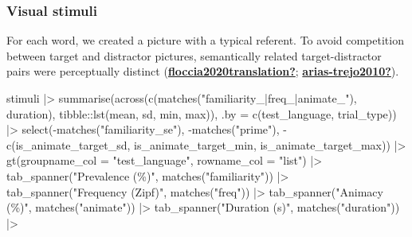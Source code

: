 \documentclass[
  letterpaper,
  DIV=11,
  numbers=noendperiod]{scrartcl}
\newenvironment{Shaded}{\begin{snugshade}}{\end{snugshade}}
\newcommand{\AttributeTok}[1]{\textcolor[rgb]{0.40,0.45,0.13}{#1}}
\newcommand{\FunctionTok}[1]{\textcolor[rgb]{0.28,0.35,0.67}{#1}}
\newcommand{\NormalTok}[1]{\textcolor[rgb]{0.00,0.23,0.31}{#1}}
\newcommand{\SpecialCharTok}[1]{\textcolor[rgb]{0.37,0.37,0.37}{#1}}
\newcommand{\StringTok}[1]{\textcolor[rgb]{0.13,0.47,0.30}{#1}}
\begin{document}
\hypertarget{visual-stimuli}{%
\subsubsection{Visual stimuli}\label{visual-stimuli}}

For each word, we created a picture with a typical referent. To avoid
competition between target and distractor pictures, semantically related
target-distractor pairs were perceptually distinct
(\protect\hyperlink{ref-floccia2020translation}{\textbf{floccia2020translation?}};
\protect\hyperlink{ref-arias-trejo2010}{\textbf{arias-trejo2010?}}).

\begin{Shaded}
\begin{Highlighting}[]
\NormalTok{stimuli }\SpecialCharTok{|\textgreater{}} 
    \FunctionTok{summarise}\NormalTok{(}\FunctionTok{across}\NormalTok{(}\FunctionTok{c}\NormalTok{(}\FunctionTok{matches}\NormalTok{(}\StringTok{"familiarity\_|freq\_|animate\_"}\NormalTok{), duration),}
\NormalTok{                     tibble}\SpecialCharTok{::}\FunctionTok{lst}\NormalTok{(mean, sd, min, max)),}
              \AttributeTok{.by =} \FunctionTok{c}\NormalTok{(test\_language, trial\_type)) }\SpecialCharTok{|\textgreater{}} 
    \FunctionTok{select}\NormalTok{(}\SpecialCharTok{{-}}\FunctionTok{matches}\NormalTok{(}\StringTok{"familiarity\_se"}\NormalTok{), }\SpecialCharTok{{-}}\FunctionTok{matches}\NormalTok{(}\StringTok{"prime"}\NormalTok{),}
           \SpecialCharTok{{-}}\FunctionTok{c}\NormalTok{(is\_animate\_target\_sd,}
\NormalTok{              is\_animate\_target\_min,}
\NormalTok{              is\_animate\_target\_max)) }\SpecialCharTok{|\textgreater{}} 
    \FunctionTok{gt}\NormalTok{(}\AttributeTok{groupname\_col =} \StringTok{"test\_language"}\NormalTok{,}
       \AttributeTok{rowname\_col =} \StringTok{"list"}\NormalTok{) }\SpecialCharTok{|\textgreater{}} 
    \FunctionTok{tab\_spanner}\NormalTok{(}\StringTok{"Prevalence (\%)"}\NormalTok{, }\FunctionTok{matches}\NormalTok{(}\StringTok{"familiarity"}\NormalTok{)) }\SpecialCharTok{|\textgreater{}} 
    \FunctionTok{tab\_spanner}\NormalTok{(}\StringTok{"Frequency (Zipf)"}\NormalTok{, }\FunctionTok{matches}\NormalTok{(}\StringTok{"freq"}\NormalTok{)) }\SpecialCharTok{|\textgreater{}}
    \FunctionTok{tab\_spanner}\NormalTok{(}\StringTok{"Animacy (\%)"}\NormalTok{, }\FunctionTok{matches}\NormalTok{(}\StringTok{"animate"}\NormalTok{)) }\SpecialCharTok{|\textgreater{}} 
    \FunctionTok{tab\_spanner}\NormalTok{(}\StringTok{"Duration (s)"}\NormalTok{, }\FunctionTok{matches}\NormalTok{(}\StringTok{"duration"}\NormalTok{)) }\SpecialCharTok{|\textgreater{}} 

\end{Highlighting}
\end{Shaded}
\end{document}
